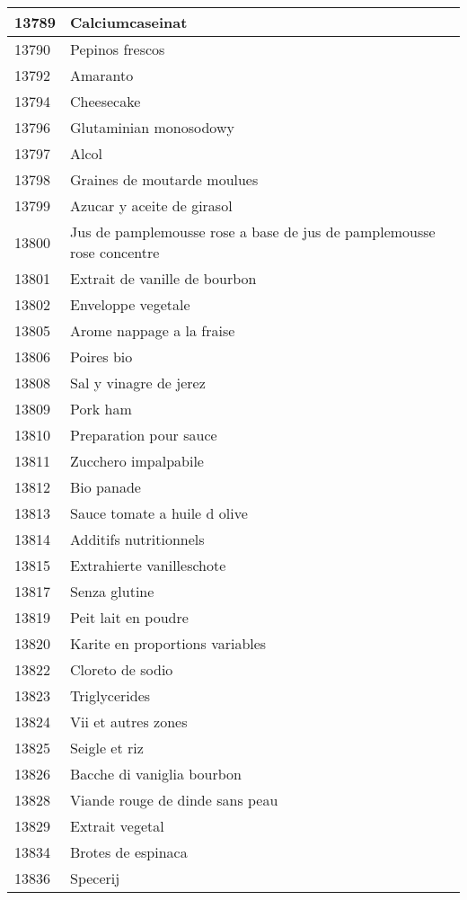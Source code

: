 \begin{longtable}{|l|l|}
13789 & Calciumcaseinat \\ \hline 
13790 & Pepinos frescos \\ \hline 
13792 & Amaranto \\ \hline 
13794 & Cheesecake \\ \hline 
13796 & Glutaminian monosodowy \\ \hline 
13797 & Alcol \\ \hline 
13798 & Graines de moutarde moulues \\ \hline 
13799 & Azucar y aceite de girasol \\ \hline 
13800 & Jus de pamplemousse rose a base de jus de pamplemousse rose concentre \\ \hline 
13801 & Extrait de vanille de bourbon \\ \hline 
13802 & Enveloppe vegetale \\ \hline 
13805 & Arome nappage a la fraise \\ \hline 
13806 & Poires bio \\ \hline 
13808 & Sal y vinagre de jerez \\ \hline 
13809 & Pork ham \\ \hline 
13810 & Preparation pour sauce \\ \hline 
13811 & Zucchero impalpabile \\ \hline 
13812 & Bio panade \\ \hline 
13813 & Sauce tomate a huile d olive \\ \hline 
13814 & Additifs nutritionnels \\ \hline 
13815 & Extrahierte vanilleschote \\ \hline 
13817 & Senza glutine \\ \hline 
13819 & Peit lait en poudre \\ \hline 
13820 & Karite en proportions variables \\ \hline 
13822 & Cloreto de sodio \\ \hline 
13823 & Triglycerides \\ \hline 
13824 & Vii et autres zones \\ \hline 
13825 & Seigle et riz \\ \hline 
13826 & Bacche di vaniglia bourbon \\ \hline 
13828 & Viande rouge de dinde sans peau \\ \hline 
13829 & Extrait vegetal \\ \hline 
13834 & Brotes de espinaca \\ \hline 
13836 & Specerij \\ \hline 

\end{longtable}
